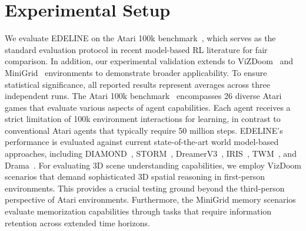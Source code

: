\section{Experimental Setup}
\label{appendix:experimental_setups}
We evaluate EDELINE on the Atari 100k benchmark~\cite{chevalier-schwarzer2023biggerbetterfasterhumanlevel}, which serves as the standard evaluation protocol in recent model-based RL literature for fair comparison. In addition, our experimental validation extends to ViZDoom~\cite{kempka2016vizdoomdoombasedairesearch} and MiniGrid~\cite{chevalier-boisvert2023minigrid} environments to demonstrate broader applicability. To ensure statistical significance, all reported results represent averages across three independent runs. The Atari 100k benchmark~\cite{chevalier-schwarzer2023biggerbetterfasterhumanlevel} encompasses 26 diverse Atari games that evaluate various aspects of agent capabilities. Each agent receives a strict limitation of 100k environment interactions for learning, in contrast to conventional Atari agents that typically require 50 million steps. EDELINE's performance is evaluated against current state-of-the-art world model-based approaches, including DIAMOND~\cite{alonso2024diamond}, STORM~\cite{zhang2023storm}, DreamerV3~\cite{hafner2024DreamerV3}, IRIS~\cite{micheli2023iris}, TWM~\cite{robine2023TWM}, and Drama~\cite{anonymous2025drama}. For evaluating 3D scene understanding capabilities, we employ VizDoom scenarios that demand sophisticated 3D spatial reasoning in first-person environments. This provides a crucial testing ground beyond the third-person perspective of Atari environments. Furthermore, the MiniGrid memory scenarios evaluate memorization capabilities through tasks that require information retention across extended time horizons.